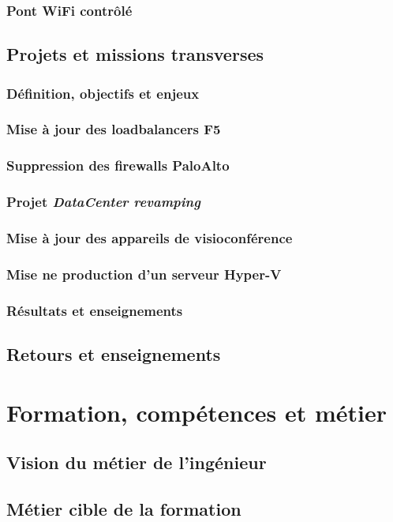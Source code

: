 \documentclass[a4paper,12pt]{report}
\begin{document}
\subsection{Pont WiFi contrôlé}
\section{Projets et missions transverses}
\subsection{Définition, objectifs et enjeux}
\subsection{Mise à jour des loadbalancers F5}
\subsection{Suppression des firewalls PaloAlto}
\subsection{Projet \textit{DataCenter revamping}}
\subsection{Mise à jour des appareils de visioconférence}
\subsection{Mise ne production d'un serveur Hyper-V}
\subsection{Résultats et enseignements}
\section{Retours et enseignements}

\chapter{Formation, compétences et métier}
\section{Vision du métier de l'ingénieur}
\section{Métier cible de la formation}
\end{document}
